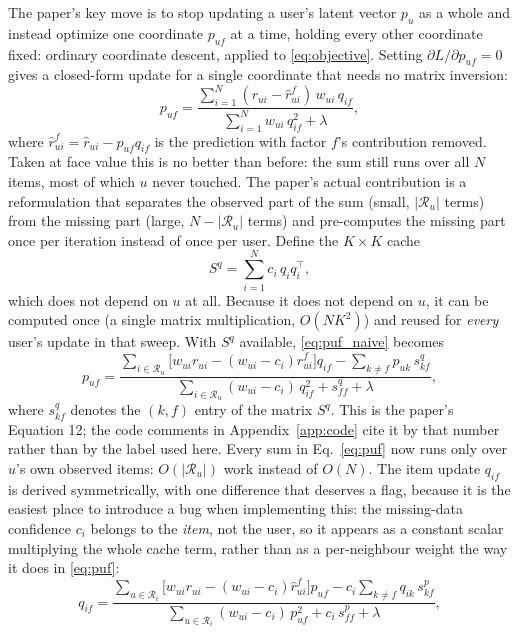 The paper's key move is to stop updating a user's latent vector $p_u$ as a
whole and instead optimize one coordinate $p_{uf}$ at a time, holding every
other coordinate fixed: ordinary coordinate descent, applied to
\eqref{eq:objective}. Setting $\partial L/\partial p_{uf}=0$ gives a
closed-form update for a single coordinate that needs no matrix inversion:
\begin{equation}
  \label{eq:puf_naive}
  p_{uf} = \frac{\sum_{i=1}^{N}(r_{ui}-\hat r_{ui}^f)\,w_{ui}\,q_{if}}
                {\sum_{i=1}^{N} w_{ui}\,q_{if}^2 + \lambda},
\end{equation}
where $\hat r_{ui}^f = \hat r_{ui} - p_{uf}q_{if}$ is the prediction with
factor $f$'s contribution removed. Taken at face value this is no better
than before: the sum still runs over all $N$ items, most of which $u$ never
touched. The paper's actual contribution is a reformulation that separates
the observed part of the sum (small, $|\mathcal{R}_u|$ terms) from the
missing part (large, $N-|\mathcal{R}_u|$ terms) and pre-computes the
missing part once per iteration instead of once per user. Define the
$K\times K$ cache
\[
  S^q = \sum_{i=1}^N c_i\, q_i q_i^\top ,
\]
which does not depend on $u$ at all. Because it does not depend on $u$, it
can be computed once (a single matrix multiplication, $O(NK^2)$) and reused
for \emph{every} user's update in that sweep. With $S^q$ available,
\eqref{eq:puf_naive} becomes
\begin{equation}
  \label{eq:puf}
  p_{uf} =
  \frac{\sum_{i\in\mathcal{R}_u}\big[w_{ui}r_{ui}-(w_{ui}-c_i)\hat r_{ui}^f\big]q_{if}
        - \sum_{k\neq f} p_{uk}\, s^q_{kf}}
       {\sum_{i\in\mathcal{R}_u}(w_{ui}-c_i)\,q_{if}^2 + s^q_{ff} + \lambda},
\end{equation}
where $s^q_{kf}$ denotes the $(k,f)$ entry of the matrix $S^q$. This is the
paper's Equation 12; the code comments in Appendix~\ref{app:code} cite it
by that number rather than by the label used here. Every sum in
Eq.~\ref{eq:puf} now runs only over $u$'s own observed items:
$O(|\mathcal{R}_u|)$ work instead of $O(N)$. The item update $q_{if}$ is
derived symmetrically, with one difference that deserves a flag, because it
is the easiest place to introduce a bug when implementing this: the
missing-data confidence $c_i$
belongs to the \emph{item}, not the user, so it appears as a constant
scalar multiplying the whole cache term, rather than as a per-neighbour
weight the way it does in \eqref{eq:puf}:
\begin{equation}
  \label{eq:qif}
  q_{if} =
  \frac{\sum_{u\in\mathcal{R}_i}\big[w_{ui}r_{ui}-(w_{ui}-c_i)\hat r_{ui}^f\big]p_{uf}
        - c_i\sum_{k\neq f} q_{ik}\, s^p_{kf}}
       {\sum_{u\in\mathcal{R}_i}(w_{ui}-c_i)\,p_{uf}^2 + c_i\, s^p_{ff} + \lambda},
\end{equation}

